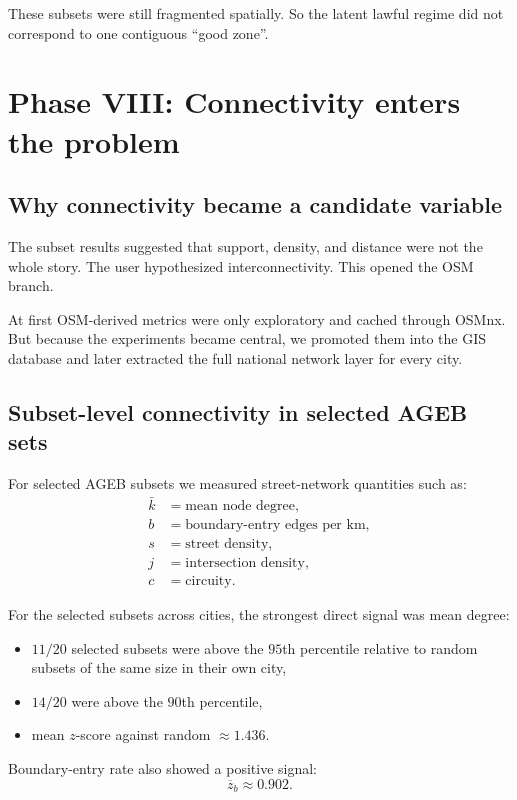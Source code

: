 \documentclass[11pt]{article}
\begin{document}
These subsets were still fragmented spatially. So the latent lawful regime did not correspond to one contiguous ``good zone''.

\section{Phase VIII: Connectivity enters the problem}

\subsection{Why connectivity became a candidate variable}

The subset results suggested that support, density, and distance were not the whole story. The user hypothesized interconnectivity. This opened the OSM branch.

At first OSM-derived metrics were only exploratory and cached through OSMnx. But because the experiments became central, we promoted them into the GIS database and later extracted the full national network layer for every city.

\subsection{Subset-level connectivity in selected AGEB sets}

For selected AGEB subsets we measured street-network quantities such as:
\begin{align}
\bar{k} &= \text{mean node degree},\\
b &= \text{boundary-entry edges per km},\\
s &= \text{street density},\\
j &= \text{intersection density},\\
c &= \text{circuity}.
\end{align}

For the selected subsets across cities, the strongest direct signal was mean degree:
\begin{itemize}
\item \(11/20\) selected subsets were above the \(95\)th percentile relative to random subsets of the same size in their own city,
\item \(14/20\) were above the \(90\)th percentile,
\item mean \(z\)-score against random \(\approx 1.436\).
\end{itemize}

Boundary-entry rate also showed a positive signal:
\begin{equation}
\overline{z}_{b} \approx 0.902.
\end{equation}
\end{document}
